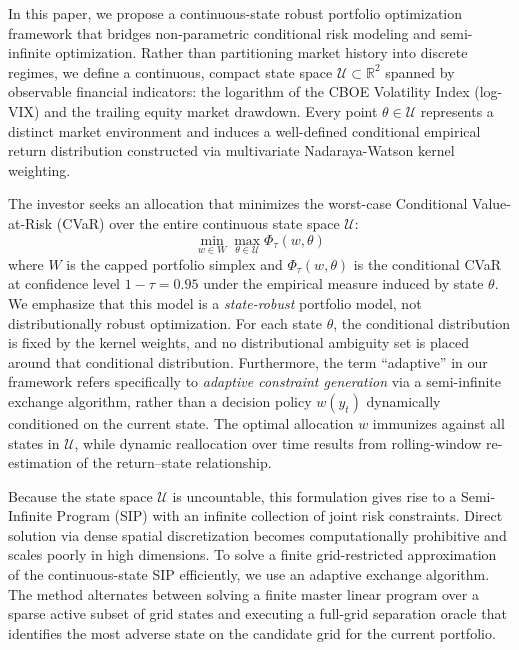 \documentclass[11pt, a4paper]{article}
\begin{document}
In this paper, we propose a continuous-state robust portfolio optimization framework that bridges non-parametric conditional risk modeling and semi-infinite optimization. Rather than partitioning market history into discrete regimes, we define a continuous, compact state space $\mathcal{U} \subset \mathbb{R}^2$ spanned by observable financial indicators: the logarithm of the CBOE Volatility Index (log-VIX) and the trailing equity market drawdown. Every point $\theta \in \mathcal{U}$ represents a distinct market environment and induces a well-defined conditional empirical return distribution constructed via multivariate Nadaraya-Watson kernel weighting.

The investor seeks an allocation that minimizes the worst-case Conditional Value-at-Risk (CVaR) over the entire continuous state space $\mathcal{U}$:
\begin{equation}
    \min_{w \in W} \max_{\theta \in \mathcal{U}} \Phi_\tau(w, \theta)
\end{equation}
where $W$ is the capped portfolio simplex and $\Phi_\tau(w, \theta)$ is the conditional CVaR at confidence level $1-\tau = 0.95$ under the empirical measure induced by state $\theta$. We emphasize that this model is a \emph{state-robust} portfolio model, not distributionally robust optimization. For each state $\theta$, the conditional distribution is fixed by the kernel weights, and no distributional ambiguity set is placed around that conditional distribution. Furthermore, the term ``adaptive'' in our framework refers specifically to \emph{adaptive constraint generation} via a semi-infinite exchange algorithm, rather than a decision policy $w(y_t)$ dynamically conditioned on the current state. The optimal allocation $w$ immunizes against all states in $\mathcal{U}$, while dynamic reallocation over time results from rolling-window re-estimation of the return--state relationship.

Because the state space $\mathcal{U}$ is uncountable, this formulation gives rise to a Semi-Infinite Program (SIP) with an infinite collection of joint risk constraints. Direct solution via dense spatial discretization becomes computationally prohibitive and scales poorly in high dimensions. To solve a finite grid-restricted approximation of the continuous-state SIP efficiently, we use an adaptive exchange algorithm. The method alternates between solving a finite master linear program over a sparse active subset of grid states and executing a full-grid separation oracle that identifies the most adverse state on the candidate grid for the current portfolio.
\end{document}
